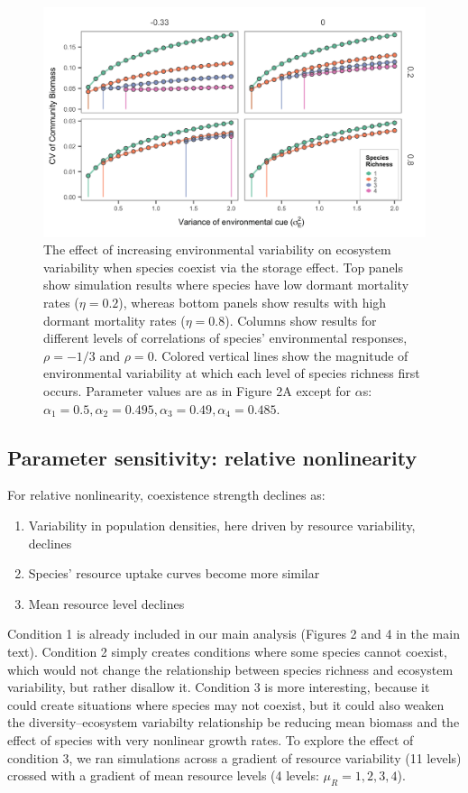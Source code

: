 \documentclass[11pt,]{article}
\providecommand{\tightlist}{%
  \setlength{\itemsep}{0pt}\setlength{\parskip}{0pt}}
\begin{document}
\begin{figure}[!ht]
  \centering
      \includegraphics[width=6in]{./components/SI_storage_effect_two_etas.png}
  \caption{The effect of increasing environmental variability on ecosystem variability when species coexist via the storage effect. Top panels show simulation results where species have low dormant mortality rates ($\eta = 0.2$), whereas bottom panels show results with high dormant mortality rates ($\eta = 0.8$). Columns show results for different levels of correlations of species' environmental responses, $\rho = -1/3$ and $\rho = 0$. Colored vertical lines show the magnitude of environmental variability at which each level of species richness first occurs. Parameter values are as in Figure 2A except for $\alpha$s: $\alpha_1 = 0.5, \alpha_2 = 0.495, \alpha_3 = 0.49, \alpha_4 = 0.485$.}
\end{figure}

\subsection{Parameter sensitivity: relative nonlinearity}

For relative nonlinearity, coexistence strength declines as:

\begin{enumerate}
\def\labelenumi{\arabic{enumi}.}
\tightlist
\item
  Variability in population densities, here driven by resource
  variability, declines
\item
  Species' resource uptake curves become more similar
\item
  Mean resource level declines
\end{enumerate}

Condition 1 is already included in our main analysis (Figures 2 and 4 in
the main text). Condition 2 simply creates conditions where some species
cannot coexist, which would not change the relationship between species
richness and ecosystem variability, but rather disallow it. Condition 3
is more interesting, because it could create situations where species
may not coexist, but it could also weaken the diversity--ecosystem
variabilty relationship be reducing mean biomass and the effect of
species with very nonlinear growth rates. To explore the effect of
condition 3, we ran simulations across a gradient of resource
variability (11 levels) crossed with a gradient of mean resource levels
(4 levels: \(\mu_R = 1,2,3,4\)).
\end{document}
